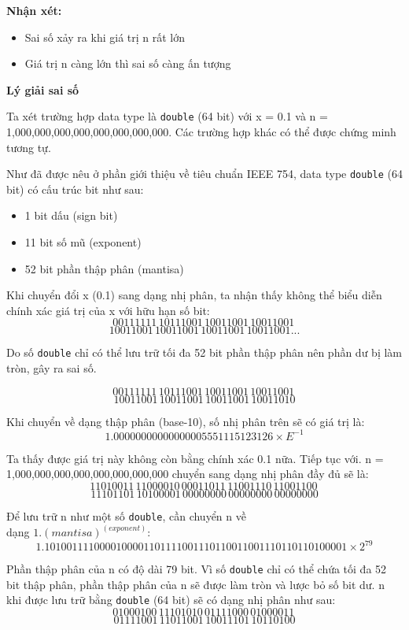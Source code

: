 \textbf{Nhận xét:}
\begin{itemize}
    \item Sai số xảy ra khi giá trị n rất lớn
    \item Giá trị n càng lớn thì sai số càng ấn tượng
\end{itemize}

\textbf{Lý giải sai số} 

Ta xét trường hợp data type là \texttt{double} (64 bit) với x = 0.1 và n = 1,000,000,000,000,000,000,000,000. Các trường hợp khác có thể được chứng minh tương tự. 
 
Như đã được nêu ở phần giới thiệu về tiêu chuẩn IEEE 754, data type \texttt{double} (64 bit) có cấu trúc bit như sau:
\begin{itemize}
    \item 1 bit dấu (sign bit)
    \item 11 bit số mũ (exponent)
    \item 52 bit phần thập phân (mantisa)
\end{itemize}

Khi chuyển đổi x (0.1) sang dạng nhị phân, ta nhận thấy không thể biểu diễn chính xác giá trị của x với hữu hạn số bit:
\[00111111\, 10111001\, 10011001\, 10011001\,\]
\[10011001\, 10011001\, 10011001\, 10011001 ...\]

Do số \texttt{double} chỉ có thể lưu trữ tối đa 52 bit phần thập phân nên phần dư bị làm tròn, gây ra sai số. 

\[00111111\, 10111001\, 10011001\, 10011001\,\]
\[10011001\, 10011001\, 10011001\, 10011010\]

Khi chuyển về dạng thập phân (base-10), số nhị phân trên sẽ có giá trị là:
\[
1.00000000000000005551115123126 \times E^{-1}
\]

Ta thấy được giá trị này không còn bằng chính xác 0.1 nữa.
Tiếp tục với. n = 1,000,000,000,000,000,000,000,000 chuyển sang dạng nhị phân đầy đủ sẽ là:
\[11010011\, 11000010\, 00011011\, 11001110\, 11001100\,\]
\[11101101\, 10100001\, 00000000\, 00000000\, 00000000\]

Để lưu trữ n như một số \texttt{double}, cần chuyển n về \\
dạng $1.(mantisa)^{(exponent)}$:
\[
1.1010011110000100001101111001110110011001110110110100001 \times 2^{79}
\]

Phần thập phân của n có độ dài 79 bit. Vì số \texttt{double} chỉ có thể chứa tối đa 52 bit thập phân, phần thập phân của n sẽ được làm tròn và lược bỏ số bit dư. n khi được lưu trữ bằng \texttt{double} (64 bit) sẽ có dạng nhị phân như sau:
\[01000100\, 11101010\, 01111000\, 01000011\,\]
\[01111001\, 11011001\, 10011101\, 10110100\]

